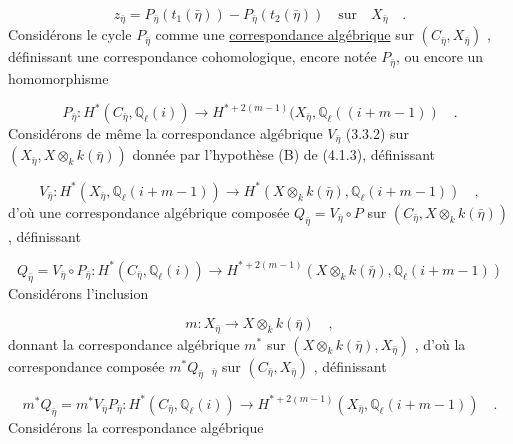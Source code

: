 \begin{equation}\tag{4.4.5}
z_{\bar{\eta}} = P_{\bar{\eta}}(t_{1}(\bar{\eta})) - P_{\bar{\eta}}(t_{2}(\bar{\eta})) \quad \text{sur} \quad X_{\bar{\eta}} \quad .
\end{equation}
Considérons le cycle $P_{\bar{\eta}}$ comme une \underline{correspondance algébrique} sur $(C_{\bar{\eta}}, X_{\bar{\eta}})$ , définissant une correspondance cohomologique, encore notée $P_{\bar{\eta}}$, ou encore un homomorphisme

\begin{equation}\tag{4.4.6}
P_{\bar{\eta}} : H^{*}(C_{\bar{\eta}},\mathbb{Q}_{\ell}(i)) \longrightarrow H^{*+2(m-1)}(X_{\bar{\eta}}, \mathbb{Q}_{\ell}((i+m-1)) \quad .
\end{equation}
Considérons de même la correspondance algébrique $V_{\bar{\eta}}$ (3.3.2) sur $(X_{\bar{\eta}}, X \otimes_{k} k(\bar{\eta}))$ donnée par l'hypothèse (B) de (4.1.3), définissant

\begin{equation}\tag{4.4.7}
V_{\bar{\eta}} : H^{*}(X_{\bar{\eta}}, \mathbb{Q}_{\ell}(i+m-1)) \longrightarrow H^{*}(X\otimes_{k}k(\bar{\eta}), \mathbb{Q}_{\ell}(i+m-1)) \quad ,
\end{equation}
d'où une correspondance algébrique composée $Q_{\bar{\eta}} = V_{\bar{\eta}} \circ P$ sur $(C_{\bar{\eta}}, X \otimes_{k} k(\bar{\eta}))$ , définissant

\begin{equation}\tag{4.4.8}
Q_{\bar{\eta}} = V_{\bar{\eta}} \circ P_{\bar{\eta}} : H^{*}(C_{\bar{\eta}},\mathbb{Q}_{\ell}(i)) \longrightarrow H^{*+2(m-1)}(X\otimes_{k}k(\bar{\eta}),\mathbb{Q}_{\ell}(i+m-1))
\end{equation}
Considérons l'inclusion

\begin{equation*}
m : X_{\bar{\eta}} \longrightarrow X \otimes_{k} k(\bar{\eta}) \quad ,
\end{equation*}
donnant la correspondance algébrique $m^{*}$ sur $(X \otimes_{k} k(\bar{\eta}), X_{\bar{\eta}})$ , d'où la correspondance composée $m^{*} Q_{\bar{\eta}} \;\; {}_{\bar{\eta}}$ sur $(C_{\bar{\eta}}, X_{\bar{\eta}})$ , définissant 



\begin{equation}\tag{4.4.9}
 m^*Q_{\bar\eta} = m^*V_{\bar\eta} P_{\bar\eta} : H^*(C_{\bar\eta}, \mathbb{Q}_\ell(i)) \longrightarrow H^{*+2(m-1)}(X_{\bar\eta},\mathbb{Q}_\ell(i+m-1)) \quad .
\end{equation}
Considérons la correspondance algébrique

